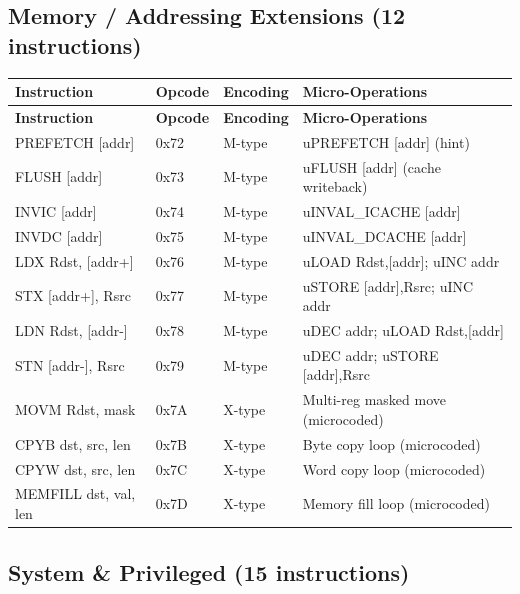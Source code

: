 \documentclass[12pt]{article}
\begin{document}
\subsection{Memory / Addressing Extensions (12 instructions)}

\begin{longtable}{@{}L{3.2cm}L{1.5cm}L{1.7cm}L{4.5cm}@{}}
\toprule
\textbf{Instruction} & \textbf{Opcode} & \textbf{Encoding} & \textbf{Micro-Operations} \\ \midrule
\endfirsthead
\toprule
\textbf{Instruction} & \textbf{Opcode} & \textbf{Encoding} & \textbf{Micro-Operations} \\ \midrule
\endhead
PREFETCH [addr] & 0x72 & M-type & uPREFETCH [addr] (hint) \\
FLUSH [addr] & 0x73 & M-type & uFLUSH [addr] (cache writeback) \\
INVIC [addr] & 0x74 & M-type & uINVAL\_ICACHE [addr] \\
INVDC [addr] & 0x75 & M-type & uINVAL\_DCACHE [addr] \\
LDX Rdst, [addr+] & 0x76 & M-type & uLOAD Rdst,[addr]; uINC addr \\
STX [addr+], Rsrc & 0x77 & M-type & uSTORE [addr],Rsrc; uINC addr \\
LDN Rdst, [addr-] & 0x78 & M-type & uDEC addr; uLOAD Rdst,[addr] \\
STN [addr-], Rsrc & 0x79 & M-type & uDEC addr; uSTORE [addr],Rsrc \\
MOVM Rdst, mask & 0x7A & X-type & Multi-reg masked move (microcoded) \\
CPYB dst, src, len & 0x7B & X-type & Byte copy loop (microcoded) \\
CPYW dst, src, len & 0x7C & X-type & Word copy loop (microcoded) \\
MEMFILL dst, val, len & 0x7D & X-type & Memory fill loop (microcoded) \\ \bottomrule
\end{longtable}

\subsection{System \& Privileged (15 instructions)}
\end{document}
